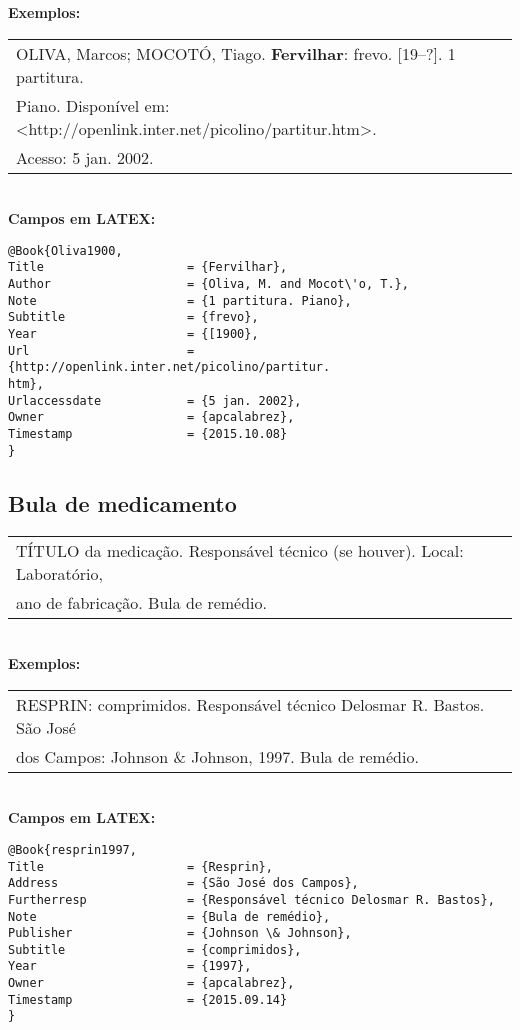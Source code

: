\textbf{Exemplos:} \\

\begin{tabular}{|l|c|} \hline
OLIVA, Marcos; MOCOTÓ, Tiago. \textbf{Fervilhar}: frevo. [19--?]. 1 partitura.
\\Piano. Disponível em: <http://openlink.inter.net/picolino/partitur.htm>.
\\Acesso: 5 jan. 2002. 
	\\\hline
\end{tabular} \\

\textbf{Campos em LATEX:} 

\begin{verbatim}
@Book{Oliva1900,
Title                    = {Fervilhar},
Author                   = {Oliva, M. and Mocot\'o, T.},
Note                     = {1 partitura. Piano},
Subtitle                 = {frevo},
Year                     = {[1900},
Url                      = {http://openlink.inter.net/picolino/partitur.
htm},
Urlaccessdate            = {5 jan. 2002},
Owner                    = {apcalabrez},
Timestamp                = {2015.10.08}
}
\end{verbatim}

\subsection{Bula de medicamento}

\begin{tabular}{|l|c|} \hline
TÍTULO da medicação. Responsável técnico (se houver). Local: Laboratório, \\ano de fabricação. Bula de remédio. 
	\\\hline
\end{tabular} \\

\textbf{Exemplos:} \\

\begin{tabular}{|l|c|} \hline
RESPRIN: comprimidos. Responsável técnico Delosmar R. Bastos. São José \\dos Campos: Johnson \& Johnson, 1997. Bula de remédio. 
	\\\hline
\end{tabular} \\

\textbf{Campos em LATEX:} 

\begin{verbatim}
@Book{resprin1997,
Title                    = {Resprin},
Address                  = {São José dos Campos},
Furtherresp              = {Responsável técnico Delosmar R. Bastos},
Note                     = {Bula de remédio},
Publisher                = {Johnson \& Johnson},
Subtitle                 = {comprimidos},
Year                     = {1997},
Owner                    = {apcalabrez},
Timestamp                = {2015.09.14}
}
\end{verbatim}

